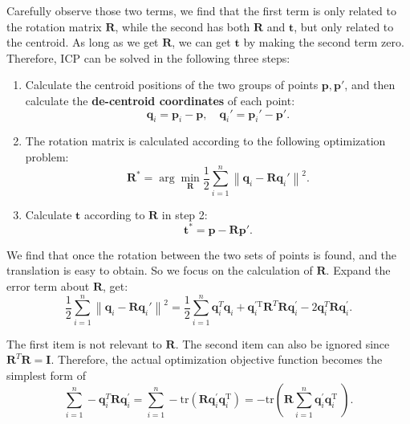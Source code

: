 Carefully observe those two terms, we find that the first term is only related to the rotation matrix $\mathbf{R}$, while the second has both $\mathbf{R}$ and $\mathbf{t}$, but only related to the centroid. As long as we get $\mathbf{R}$, we can get $\mathbf{t}$ by making the second term zero. Therefore, ICP can be solved in the following three steps:

\begin{mdframed}
\begin{enumerate}
	\item Calculate the centroid positions of the two groups of points $\mathbf{p}, \mathbf{p}'$, and then calculate the \textbf{de-centroid coordinates} of each point:
	\[
	\mathbf{q}_i = \mathbf{p}_i - \mathbf{p}, \quad \mathbf{q}_i' = \mathbf{p}_i' - \mathbf{p}'.
	\]
	\item The rotation matrix is calculated according to the following optimization problem:
	\begin{equation}
		\mathbf{R}^* = \arg \mathop {\min }\limits_{\mathbf{R}} \frac{1}{2}\sum\limits_{i = 1}^n {{\left\| {{\mathbf{q}_i} - \mathbf{R} \mathbf{q}_i' } \right\|}^2}.
	\end{equation}
	\item Calculate $\mathbf{t}$ according to $\mathbf{R}$ in step 2:
	\begin{equation}
	\label{eq:pnp-solve-t}
	\mathbf{t}^* = \mathbf{p} - \mathbf{R} \mathbf{p}'.
	\end{equation}
\end{enumerate}
\end{mdframed}

We find that once the rotation between the two sets of points is found, and the translation is easy to obtain. So we focus on the calculation of $\mathbf{R}$. Expand the error term about $\mathbf{R}$, get:
\begin{equation}
 \frac{1}{2}\sum\limits_{i = 1}^n \left\| {{\mathbf{q}_i} - \mathbf{R} \mathbf{q}_i' } \right\|^2 = \frac{1}{2}\sum\limits_{i = 1}^n \mathbf{q}_i^T \mathbf{q}_i + \mathbf{q}_i^{ \prime \mathrm{T}}  \mathbf{R}^T \mathbf{R} \mathbf{q}^\prime_i - 2\mathbf{q}_i^T \mathbf{R} \mathbf{q}^\prime_i.
\end{equation}

The first item is not relevant to $\mathbf{R}$. The second item can also be ignored since $\mathbf{R}^T\mathbf{R}=\mathbf{I}$. Therefore, the actual optimization objective function becomes the simplest form of
\begin{equation}
\sum\limits_{i = 1}^n - \mathbf{q}_i^T \mathbf{R} \mathbf{q}^\prime_i = \sum\limits_{i = 1}^n -\mathrm{tr} \left( \mathbf{R} \mathbf{q}_i^{\prime} \mathbf{q}^{\mathrm{T}}_i \right) = - \mathrm{tr} \left( \mathbf{R} \sum\limits_{i = 1}^n \mathbf{q}_i^{\prime} \mathbf{q}^{\mathrm{T}}_i \ \right).
\end{equation}

